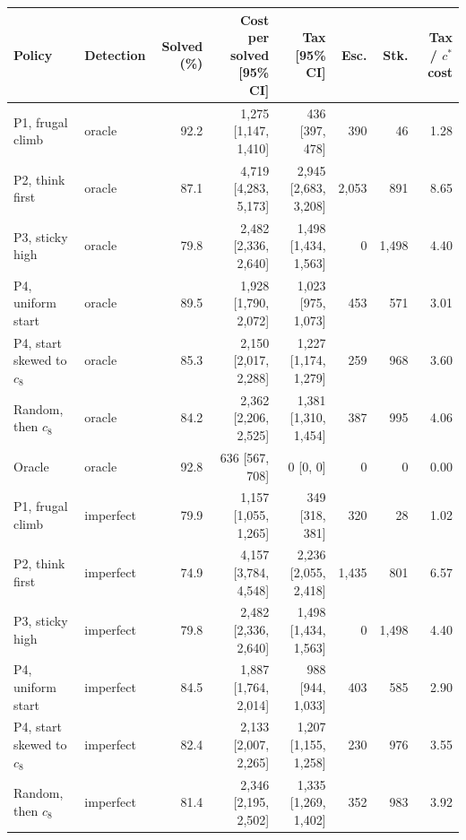 \begin{tabular}{@{}llrrrrrr@{}}
\toprule
Policy & Detection & Solved (\%) & Cost per solved [95\% CI] & Tax [95\% CI] & Esc. & Stk. & Tax / $c^*$ cost \\
\midrule
P1, frugal climb & oracle & 92.2 & 1{,}275 [1{,}147, 1{,}410] & 436 [397, 478] & 390 & 46 & 1.28 \\
P2, think first & oracle & 87.1 & 4{,}719 [4{,}283, 5{,}173] & 2{,}945 [2{,}683, 3{,}208] & 2{,}053 & 891 & 8.65 \\
P3, sticky high & oracle & 79.8 & 2{,}482 [2{,}336, 2{,}640] & 1{,}498 [1{,}434, 1{,}563] & 0 & 1{,}498 & 4.40 \\
P4, uniform start & oracle & 89.5 & 1{,}928 [1{,}790, 2{,}072] & 1{,}023 [975, 1{,}073] & 453 & 571 & 3.01 \\
P4, start skewed to $c_8$ & oracle & 85.3 & 2{,}150 [2{,}017, 2{,}288] & 1{,}227 [1{,}174, 1{,}279] & 259 & 968 & 3.60 \\
Random, then $c_8$ & oracle & 84.2 & 2{,}362 [2{,}206, 2{,}525] & 1{,}381 [1{,}310, 1{,}454] & 387 & 995 & 4.06 \\
Oracle & oracle & 92.8 & 636 [567, 708] & 0 [0, 0] & 0 & 0 & 0.00 \\
\midrule
P1, frugal climb & imperfect & 79.9 & 1{,}157 [1{,}055, 1{,}265] & 349 [318, 381] & 320 & 28 & 1.02 \\
P2, think first & imperfect & 74.9 & 4{,}157 [3{,}784, 4{,}548] & 2{,}236 [2{,}055, 2{,}418] & 1{,}435 & 801 & 6.57 \\
P3, sticky high & imperfect & 79.8 & 2{,}482 [2{,}336, 2{,}640] & 1{,}498 [1{,}434, 1{,}563] & 0 & 1{,}498 & 4.40 \\
P4, uniform start & imperfect & 84.5 & 1{,}887 [1{,}764, 2{,}014] & 988 [944, 1{,}033] & 403 & 585 & 2.90 \\
P4, start skewed to $c_8$ & imperfect & 82.4 & 2{,}133 [2{,}007, 2{,}265] & 1{,}207 [1{,}155, 1{,}258] & 230 & 976 & 3.55 \\
Random, then $c_8$ & imperfect & 81.4 & 2{,}346 [2{,}195, 2{,}502] & 1{,}335 [1{,}269, 1{,}402] & 352 & 983 & 3.92 \\
\bottomrule
\end{tabular}
